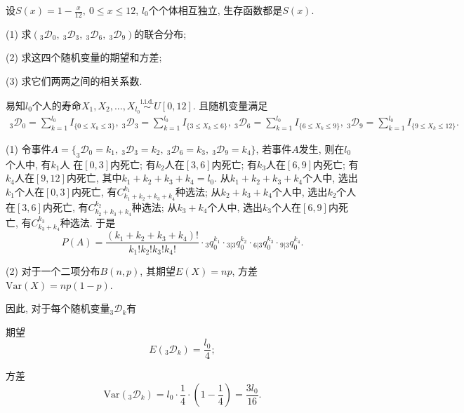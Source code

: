 \documentclass[lang=cn,10pt]{elegantbook}
\begin{document}
\begin{example}
    设$S(x)=1-\frac{x}{12},\ 0\leq x\leq 12$, $l_{0}$个个体相互独立, 生存函数都是$S(x)$.

    (1) 求$(_{3}\mathscr D _{0},\ _{3}\mathscr D_{3},\ _{3}\mathscr D _{6},\ _{3}\mathscr D _{9})$的联合分布;

    (2) 求这四个随机变量的期望和方差;

    (3) 求它们两两之间的相关系数.
\end{example}

\begin{solution}
易知$l_{0}$个人的寿命$X_{1},X_{2},...,X_{l_{0}}\stackrel{\text{i.i.d.}}{\sim}U[0,12]$. 且随机变量满足
\begin{align*}
  {}_{3}\mathscr D _{0}=\sum^{l_{0}}_{k=1}I_{\{0\leq X_k \leq 3\}},~{}_{3}\mathscr D _{3}=\sum^{l_{0}}_{k=1}I_{\{3\leq X_k \leq 6\}},~{}_{3}\mathscr D _{6}=\sum^{l_{0}}_{k=1}I_{\{6\leq X_k \leq 9\}},~{}_{3}\mathscr D _{9}=\sum^{l_{0}}_{k=1}I_{\{9\leq X_k \leq 12\}}.
\end{align*}

(1) 令事件$A=\{_{3}\mathscr D _{0}=k_{1},\ _{3}\mathscr D _{3}=k_{2},\ _{3}\mathscr D _{6}=k_{3},\ _{3}\mathscr D _{9}=k_{4}\}$, 若事件$A$发生, 则在$l_{0}$个人中, 有$k_{1}$人
在$[0,3]$内死亡; 有$k_{2}$人在$[3,6]$内死亡; 有$k_{3}$人在$[6,9]$内死亡; 有$k_{4}$人在$[9,12]$内死亡, 其中$k_{1}+k_{2}+k_{3}+k_{4}=l_{0}.$ 从$k_{1}+k_{2}+k_{3}+k_{4}$个人中, 选出$k_{1}$个人在$[0,3]$内死亡, 有$C_{k_{1}+k_{2}+k_{3}+k_{4}}^{k_{1}}$种选法; 从$k_{2}+k_{3}+k_{4}$个人中, 选出$k_{2}$个人在$[3,6]$内死亡, 有$C_{k_{2}+k_{3}+k_{4}}^{k_{2}}$种选法; 从$k_{3}+k_{4}$个人中, 选出$k_{3}$个人在$[6,9]$内死亡, 有$C_{k_{3}+k_{4}}^{k_{3}}$种选法. 于是
$$
    P(A)=\frac{(k_{1}+k_{2}+k_{3}+k_{4})!}{k_{1}!k_{2}!k_{3}!k_{4}!}\cdot {}_{3}q_{0}^{k_{1}}\cdot {}_{3|3}q_{0}^{k_{2}}\cdot {}_{6|3}q_{0}^{k_{3}}\cdot {}_{9|3}q_{0}^{k_{4}}.
$$

(2) 对于一个二项分布$B(n, p)$, 其期望$E(X) = np$, 方差$\text{Var}(X) = np(1-p)$.

因此, 对于每个随机变量$_{3}\mathscr D_{k}$有

期望 $$E(_{3}\mathscr D_{k}) = \frac{l_0}{4};$$

方差 $$\text{Var}(_{3}\mathscr D_{k}) = l_0 \cdot \frac{1}{4} \cdot \left(1 - \frac{1}{4}\right) = \frac{3l_0}{16}.$$


\end{solution}
\end{document}
